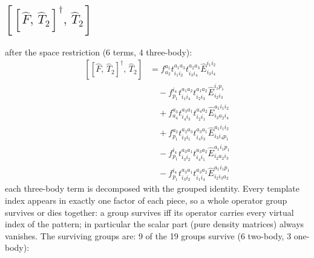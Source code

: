 \documentclass[11pt]{article}
\begin{document}
\subsection*{$\left[\left[\hat{F},\, \hat{T}_{2}\right]^{\dagger},\, \hat{T}_{2}\right]$}
after the space restriction (6 terms, 4 three-body):
\begin{align}
\left[\left[\hat{F},\, \hat{T}_{2}\right]^{\dagger},\, \hat{T}_{2}\right] &= f^{a_{1}}_{a_{2}} t^{a_{1}a_{3}}_{i_{1}i_{2}} t^{a_{2}a_{3}}_{i_{3}i_{4}} \hat{E}^{i_{1}i_{2}}_{i_{3}i_{4}} \\
&\quad - f^{i_{4}}_{p_{1}} t^{a_{1}a_{2}}_{i_{1}i_{4}} t^{a_{1}a_{2}}_{i_{2}i_{3}} \hat{E}^{i_{1}p_{1}}_{i_{2}i_{3}} \\
&\quad + f^{a_{3}}_{a_{4}} t^{a_{3}a_{1}}_{i_{4}i_{3}} t^{a_{4}a_{2}}_{i_{2}i_{1}} \hat{E}^{a_{1}i_{1}i_{2}}_{i_{3}a_{2}i_{4}} \\
&\quad + f^{a_{2}}_{p_{1}} t^{a_{2}a_{3}}_{i_{2}i_{1}} t^{a_{3}a_{1}}_{i_{4}i_{3}} \hat{E}^{a_{1}i_{1}i_{2}}_{i_{3}i_{4}p_{1}} \\
&\quad - f^{i_{4}}_{p_{1}} t^{a_{3}a_{1}}_{i_{3}i_{2}} t^{a_{3}a_{2}}_{i_{4}i_{1}} \hat{E}^{a_{1}i_{1}p_{1}}_{i_{2}a_{2}i_{3}} \\
&\quad - f^{i_{4}}_{p_{1}} t^{a_{3}a_{1}}_{i_{3}i_{2}} t^{a_{3}a_{2}}_{i_{1}i_{4}} \hat{E}^{a_{1}i_{1}p_{1}}_{i_{2}i_{3}a_{2}}
\end{align}
each three-body term is decomposed with the grouped identity. Every template index appears in exactly one factor of each piece, so a whole operator group survives or dies together: a group survives iff its operator carries every virtual index of the pattern; in particular the scalar part (pure density matrices) always vanishes.  The surviving groups are:
9 of the 19 groups survive (6 two-body, 3 one-body):
\end{document}
